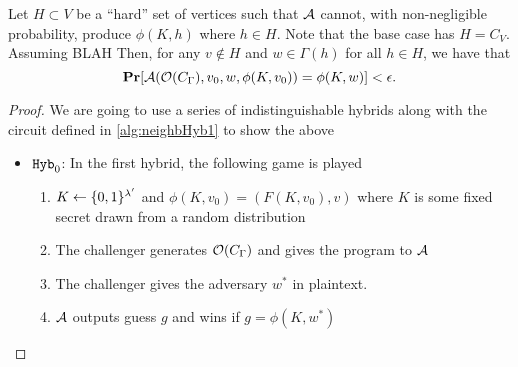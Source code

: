 \begin{lemma}
	Let $H \subset V$ be a ``hard'' set of vertices such that $\mathcal{A}$ cannot, with non-negligible probability, produce 
	$\phi(K, h)$ where $h \in H$. Note that the base case has $H = C_V$. 
	Assuming BLAH
	Then, 
	for any $v \notin H$ and $w \in \Gamma(h)$ for all $h \in H$, we have that
	\begin{equation*}
		\operatorname*{\mathbf{Pr}}[\mathcal{A}(\mathcal{O}(C_\Gamma), v_0, w, \phi(K, v_0)) = \phi(K, w)] < \epsilon.
	\end{equation*}
	\begin{proof}
		We are going to use a series of indistinguishable hybrids along with the circuit defined in \ref{alg:neighbHyb1} to show the above
		\begin{itemize}
			\item $\texttt{Hyb}_0$: In the first hybrid, the following game is played
				\begin{enumerate}
					\item $K \gets \{0,1\}^{\lambda'}$ and $\phi(K, v_0) = (F(K, v_0), v)$ where $K$ is some fixed secret drawn from a random distribution
					\item The challenger generates $\mathcal{O}(C_\Gamma)$ and gives the program to $\mathcal{A}$
					\item The challenger gives the adversary $w^*$ in plaintext.
					\item $\mathcal{A}$ outputs guess $g$ and wins if $g = \phi(K, w^*)$ %
				\end{enumerate}
			

\end{itemize}
\end{proof}
\end{lemma}
